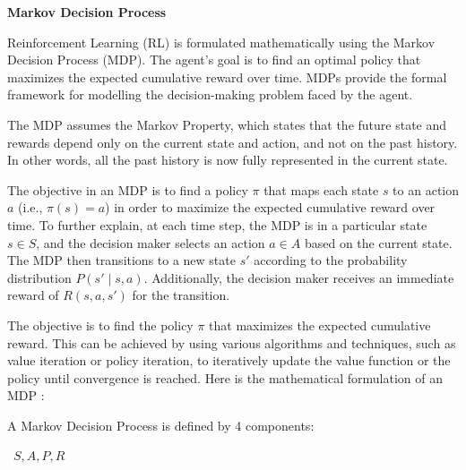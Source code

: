 




\begin{textblock}
{\bf Markov Decision Process }


Reinforcement Learning (RL) is formulated mathematically using the Markov Decision Process (MDP). The agent's goal is to find an optimal policy that maximizes the expected cumulative reward over time. MDPs provide the formal framework for modelling the decision-making problem faced by the agent. 

The MDP assumes the Markov Property, which states that the future state and rewards depend only on the current state and action, and not on the past history. In other words, all the past history is now fully represented in the current state. 

The objective in an MDP is to find a policy $\pi$ that maps each state $s$ to an action $a$ (i.e., $\pi(s) = a$) in order to maximize the expected cumulative reward over time. To further explain, at each time step, the MDP is in a particular state $s \in S$, and the decision maker selects an action $a \in A$ based on the current state. The MDP then transitions to a new state $s'$ according to the probability distribution $P(s' \mid s, a)$. Additionally, the decision maker receives an immediate reward of $R(s, a, s')$ for the transition.

The objective is to find the policy $\pi$ that maximizes the expected cumulative reward. This can be achieved by using various algorithms and techniques, such as value iteration or policy iteration, to iteratively update the value function or the policy until convergence is reached. Here is the mathematical formulation of an MDP \cite{suttonandbarto2018}\cite{aima2022}:

A Markov Decision Process is defined by 4 components:\\
\begin{center}
{\large
\textlangle \ $S, A, P, R$ \textrangle 
}
\end{center}

\end{textblock}

